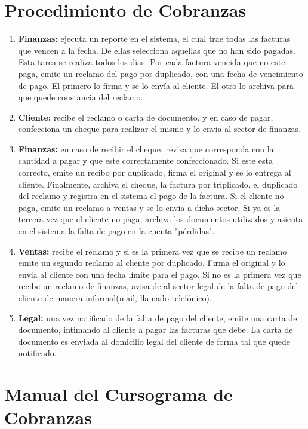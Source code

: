 \section{Procedimiento de Cobranzas}
\begin{enumerate}
  \item \textbf{Finanzas:} ejecuta un reporte en el sistema, el cual trae todas las facturas que vencen a la fecha. De ellas selecciona aquellas que no han sido pagadas. Esta tarea se realiza todos los días.
  Por cada factura vencida que no este paga, emite un reclamo del pago por duplicado, con una fecha de vencimiento de pago. El primero lo firma y se lo envía al cliente. El otro lo archiva para que quede constancia del reclamo.
  \item \textbf{Cliente:} recibe el reclamo o carta de documento, y en caso de pagar, confecciona un cheque para realizar el mismo y lo envia al sector de finanzas.
  \item \textbf{Finanzas:} en caso de recibir el cheque, revisa que corresponda con la cantidad a pagar y que este correctamente confeccionado. Si este esta correcto, emite un recibo por duplicado, firma el original y se lo entrega al cliente. Finalmente, archiva el cheque, la factura por triplicado, el duplicado del reclamo y registra en el sistema el pago de la factura.
  Si el cliente no paga, emite un reclamo a ventas y se lo envia a dicho sector. Si ya es la tercera vez que el cliente no paga, archiva los documentos utilizados y asienta en el sistema la falta de pago en la cuenta "pérdidas".
  \item \textbf{Ventas:} recibe el reclamo y si es la primera vez que se recibe un reclamo emite un segundo reclamo al cliente por duplicado. Firma el original y lo envia al cliente con una fecha límite para el pago. Si no es la primera vez que recibe un reclamo de finanzas, avisa de al sector legal de la falta de pago del cliente de manera informal(mail, llamado telefónico).
  \item \textbf{Legal:} una vez notificado de la falta de pago del cliente, emite una carta de documento, intimando al cliente a pagar las facturas que debe. La carta de documento es enviada al domicilio legal del cliente de forma tal que quede notificado.
\end{enumerate}

\pagebreak
\section{Manual del Cursograma de Cobranzas}

